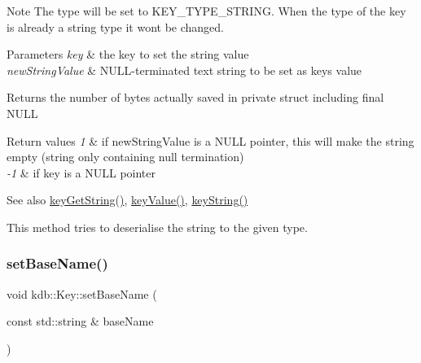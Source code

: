 \begin{DoxyNote}{Note}
The type will be set to K\+E\+Y\+\_\+\+T\+Y\+P\+E\+\_\+\+S\+T\+R\+I\+NG. When the type of the key is already a string type it won\textquotesingle{}t be changed.
\end{DoxyNote}

\begin{DoxyParams}{Parameters}
{\em key} & the key to set the string value \\
\hline
{\em new\+String\+Value} & N\+U\+L\+L-\/terminated text string to be set as {\ttfamily key\textquotesingle{}s} value \\
\hline
\end{DoxyParams}
\begin{DoxyReturn}{Returns}
the number of bytes actually saved in private struct including final N\+U\+LL 
\end{DoxyReturn}

\begin{DoxyRetVals}{Return values}
{\em 1} & if new\+String\+Value is a N\+U\+LL pointer, this will make the string empty (string only containing null termination) \\
\hline
{\em -\/1} & if key is a N\+U\+LL pointer \\
\hline
\end{DoxyRetVals}
\begin{DoxySeeAlso}{See also}
\hyperlink{group__keyvalue_ga41b9fac5ccddafe407fc0ae1e2eb8778}{key\+Get\+String()}, \hyperlink{group__keyvalue_ga6f29609c5da53c6dc26a98678d5752af}{key\+Value()}, \hyperlink{group__keyvalue_ga880936f2481d28e6e2acbe7486a21d05}{key\+String()}
\end{DoxySeeAlso}
This method tries to deserialise the string to the given type. \mbox{\label{classkdb_1_1Key_a0c8c7cef03d6482d89973be72fb3c8b8}} 
\subsubsection{\texorpdfstring{set\+Base\+Name()}{setBaseName()}}
{\footnotesize\ttfamily void kdb\+::\+Key\+::set\+Base\+Name (\begin{DoxyParamCaption}\item[{const std\+::string \&}]{base\+Name }\end{DoxyParamCaption})\hspace{0.3cm}{\ttfamily [inline]}}



